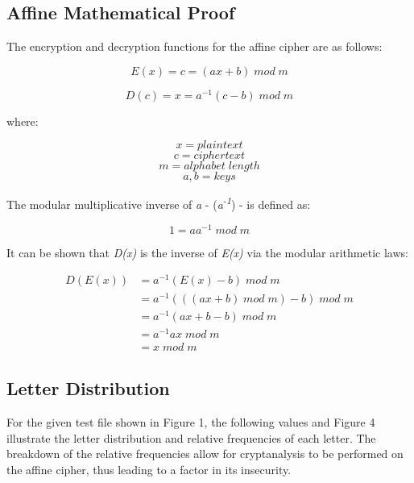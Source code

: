 \documentclass[]{article}
\begin{document}
\newpage
\subsection*{Affine Mathematical Proof}

The encryption and decryption functions for the affine cipher are as follows:

$$E(x)=c=(ax+b)\;mod\;m$$

$$D(c)=x=a^{-1}(c-b)\;mod\;m$$

\noindent
where:

$$x = plaintext$$
$$c = ciphertext$$
$$m = alphabet\;length$$
$$a,b=keys$$
\vspace{0.5cm}

\noindent
The modular multiplicative inverse of \textit{a} - (\textit{a\textsuperscript{-1}}) -  is defined as:

$$1=aa^{-1}\;mod\;m$$

\noindent
It can be shown that \textit{D(x)} is the inverse of \textit{E(x)} via the modular arithmetic laws:

\begin{equation*}
\begin{split}
D(E(x)) & = a^{-1}(E(x)-b)\;mod\;m \\
& = a^{-1}(( (ax+b)\;mod\;m )-b)\;mod\;m \\
& = a^{-1} (ax+b-b) \;mod\;m \\
& = a^{-1}ax\;mod\;m \\
& = x\;mod\;m
\end{split}
\end{equation*}

\newpage
\subsection*{Letter Distribution}

For the given test file shown in Figure 1, the following values and Figure 4 illustrate the letter distribution and relative frequencies of each letter. The breakdown of the relative frequencies allow for cryptanalysis to be performed on the affine cipher, thus leading to a factor in its insecurity.
\end{document}
